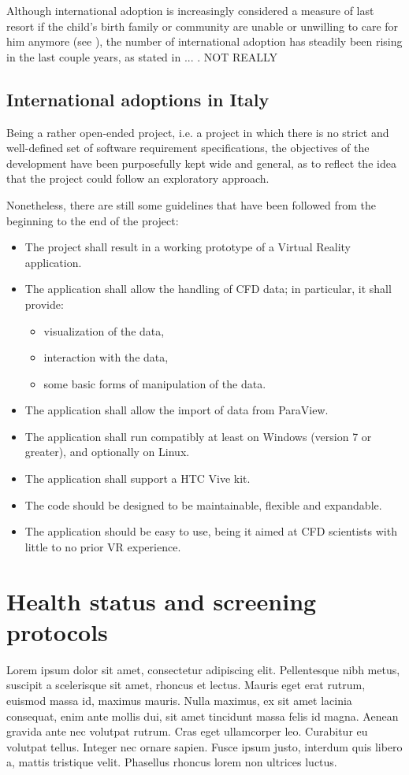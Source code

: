 Although international adoption is increasingly considered a measure of last resort if the child's birth family or community are unable or unwilling to care for him anymore (see \cite{nelson}), the number of international adoption has steadily been rising in the last couple years, as stated in ... . NOT REALLY


\subsection{International adoptions in Italy}\label{sub:adoptionsinitaly}
Being a rather open-ended project, i.e. a project in which there is no strict and well-defined set of software requirement specifications, the objectives of the development have been purposefully kept wide and general, as to reflect the idea that the project could follow an exploratory approach.

Nonetheless, there are still some guidelines that have been followed from the beginning to the end of the project:

\begin{itemize}
	\item The project shall result in a working prototype of a Virtual Reality application.
	\item The application shall allow the handling of CFD data; in particular, it shall provide:
	\begin{itemize}
		\item visualization of the data,
		\item interaction with the data,
		\item some basic forms of manipulation of the data.
	\end{itemize}
	\item The application shall allow the import of data from ParaView.
	\item The application shall run compatibly at least on Windows (version 7 or greater), and optionally on Linux.
	\item The application shall support a HTC Vive kit.
	\item The code should be designed to be maintainable, flexible and expandable.
	\item The application should be easy to use, being it aimed at CFD scientists with little to no prior VR experience.
\end{itemize}


\section{Health status and screening protocols}\label{sec:screeningprotocols}
Lorem ipsum dolor sit amet, consectetur adipiscing elit. Pellentesque nibh metus, suscipit a scelerisque sit amet, rhoncus et lectus. Mauris eget erat rutrum, euismod massa id, maximus mauris. Nulla maximus, ex sit amet lacinia consequat, enim ante mollis dui, sit amet tincidunt massa felis id magna. Aenean gravida ante nec volutpat rutrum. Cras eget ullamcorper leo. Curabitur eu volutpat tellus. Integer nec ornare sapien. Fusce ipsum justo, interdum quis libero a, mattis tristique velit. Phasellus rhoncus lorem non ultrices luctus.

